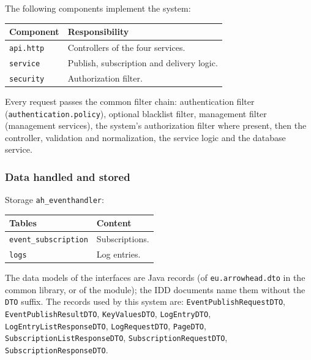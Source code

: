\documentclass[a4paper]{arrowhead}
\begin{document}
The following components implement the system:

\noindent\begin{longtable}{| p{5.6cm} | p{9.6cm} |} \hline
\rowcolor{gray!33} Component & Responsibility \\ \hline \endhead
\texttt{api.\allowbreak{}http} & Controllers of the four services. \\ \hline
\texttt{service} & Publish, subscription and delivery logic. \\ \hline
\texttt{security} & Authorization filter. \\ \hline
\end{longtable}

Every request passes the common filter chain: authentication filter (\texttt{authentication.\allowbreak{}policy}), optional blacklist filter, management filter (management services), the system's authorization filter where present, then the controller, validation and normalization, the service logic and the database service.

\subsubsection{Data handled and stored}

Storage \texttt{ah\_\allowbreak{}eventhandler}:

\noindent\begin{longtable}{| p{6.4cm} | p{8.8cm} |} \hline
\rowcolor{gray!33} Tables & Content \\ \hline \endhead
\texttt{event\_\allowbreak{}subscription} & Subscriptions. \\ \hline
\texttt{logs} & Log entries. \\ \hline
\end{longtable}

The data models of the interfaces are Java records (of \texttt{eu.arrowhead.dto} in the common library, or of the module); the IDD documents name them without the \texttt{DTO} suffix. The records used by this system are: \texttt{Event\allowbreak{}Publish\allowbreak{}Request\allowbreak{}DTO}, \texttt{Event\allowbreak{}Publish\allowbreak{}Result\allowbreak{}DTO}, \texttt{KeyValuesDTO}, \texttt{LogEntryDTO}, \texttt{Log\allowbreak{}Entry\allowbreak{}List\allowbreak{}Response\allowbreak{}DTO}, \texttt{LogRequestDTO}, \texttt{PageDTO}, \texttt{Subscription\allowbreak{}List\allowbreak{}Response\allowbreak{}DTO}, \texttt{Subscription\allowbreak{}Request\allowbreak{}DTO}, \texttt{Subscription\allowbreak{}Response\allowbreak{}DTO}.
\end{document}
